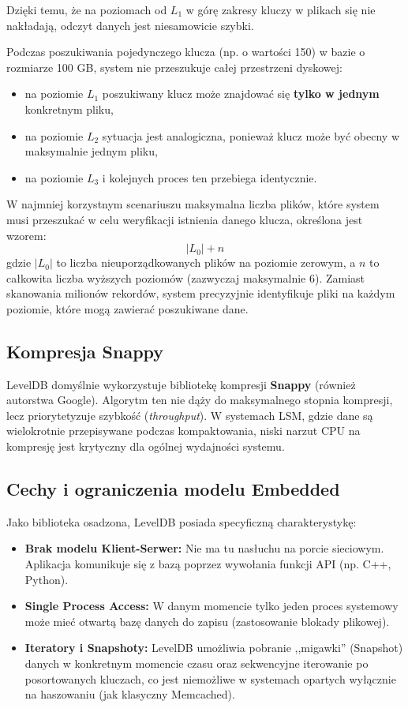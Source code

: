 Dzięki temu, że na poziomach od $L_1$ w górę zakresy kluczy w plikach się nie nakładają, odczyt danych jest niesamowicie szybki.

Podczas poszukiwania pojedynczego klucza (np. o wartości 150) w bazie o rozmiarze 100 GB, system nie przeszukuje całej przestrzeni dyskowej:
\begin{itemize}
    \item na poziomie $L_1$ poszukiwany klucz może znajdować się \textbf{tylko w jednym} konkretnym pliku,
    \item na poziomie $L_2$ sytuacja jest analogiczna, ponieważ klucz może być obecny w maksymalnie jednym pliku,
    \item na poziomie $L_3$ i kolejnych proces ten przebiega identycznie.
\end{itemize}

W najmniej korzystnym scenariuszu maksymalna liczba plików, które system musi przeszukać w celu weryfikacji istnienia danego klucza, określona jest wzorem:
$$|L_0| + n$$
gdzie $|L_0|$ to liczba nieuporządkowanych plików na poziomie zerowym, a $n$ to całkowita liczba wyższych poziomów (zazwyczaj maksymalnie 6). Zamiast skanowania milionów rekordów, system precyzyjnie identyfikuje pliki na każdym poziomie, które mogą zawierać poszukiwane dane.

\subsection{Kompresja Snappy}
LevelDB domyślnie wykorzystuje bibliotekę kompresji \textbf{Snappy} (również autorstwa Google). Algorytm ten nie dąży do maksymalnego stopnia kompresji, lecz priorytetyzuje szybkość (\textit{throughput}). W systemach LSM, gdzie dane są wielokrotnie przepisywane podczas kompaktowania, niski narzut CPU na kompresję jest krytyczny dla ogólnej wydajności systemu.

\subsection{Cechy i ograniczenia modelu Embedded}
Jako biblioteka osadzona, LevelDB posiada specyficzną charakterystykę:
\begin{itemize}
    \item \textbf{Brak modelu Klient-Serwer:} Nie ma tu nasłuchu na porcie sieciowym. Aplikacja komunikuje się z bazą poprzez wywołania funkcji API (np. C++, Python).
    \item \textbf{Single Process Access:} W danym momencie tylko jeden proces systemowy może mieć otwartą bazę danych do zapisu (zastosowanie blokady plikowej).
    \item \textbf{Iteratory i Snapshoty:} LevelDB umożliwia pobranie ,,migawki'' (Snapshot) danych w konkretnym momencie czasu oraz sekwencyjne iterowanie po posortowanych kluczach, co jest niemożliwe w systemach opartych wyłącznie na haszowaniu (jak klasyczny Memcached).
\end{itemize}

